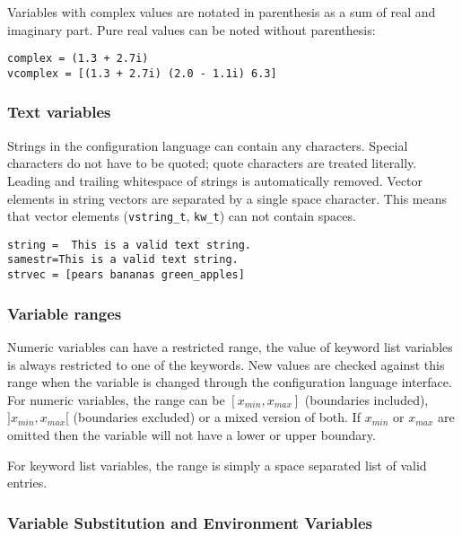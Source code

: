 Variables with complex values are notated in parenthesis as a sum of
real and imaginary part. Pure real values can be noted without
parenthesis:

\begin{verbatim}
complex = (1.3 + 2.7i)
vcomplex = [(1.3 + 2.7i) (2.0 - 1.1i) 6.3]
\end{verbatim}

\subsubsection{Text variables}

Strings in the \mha{} configuration language can contain any characters. Special
characters do not have to be quoted; quote characters are treated
literally. Leading and trailing whitespace of strings is automatically
removed. Vector elements in string vectors are separated by a single
space character. This means that vector elements
(\verb!vstring_t!, \verb!kw_t!) can not contain spaces.

\begin{verbatim}
string =  This is a valid text string.
samestr=This is a valid text string.
strvec = [pears bananas green_apples]
\end{verbatim}

\subsubsection{Variable ranges}

Numeric variables can have a restricted range, the value of keyword list 
variables is always restricted to one of the keywords. New values are checked 
against this range when the variable is changed through the \mha{} configuration 
language interface. For numeric variables, the range can be 
$[x_{min},x_{max}]$ (boundaries included), $]x_{min},x_{max}[$
(boundaries excluded) or a mixed version of both. If $x_{min}$ or
$x_{max}$ are omitted then the variable will not have a lower or
upper boundary.

For keyword list variables, the range is simply a space separated list of valid
entries.

\subsubsection{Variable Substitution and Environment
  Variables}

